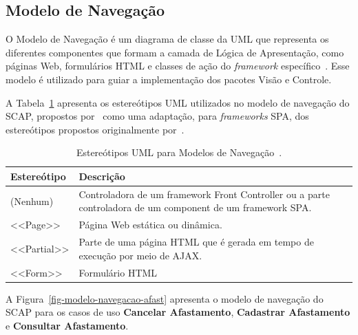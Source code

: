 
\subsection{Modelo de Navegação}
\label{subsec-frameweb-navegacao}

O Modelo de Navegação é um diagrama de classe da UML que representa os diferentes componentes que
formam a camada de Lógica de Apresentação, como páginas Web, formulários HTML e classes de ação do \textit{framework} específico~\cite{souza:2007}. 
Esse modelo é utilizado para guiar a implementação dos pacotes Visão e Controle.

A Tabela~\ref{tab-estereotipos-navegacao} apresenta os estereótipos UML utilizados no modelo de navegação do SCAP,
propostos por~ como uma adaptação, para \textit{frameworks} SPA,
dos estereótipos propostos originalmente por~.

\begin{table}[h!]
    \centering
    \caption{Estereótipos UML para Modelos de Navegação~\cite{hoppe:2023}.}
    \label{tab-estereotipos-navegacao}
    \begin{tabular}{|p{3cm}|p{12cm}|}
        \hline
        \textbf{Estereótipo} & \textbf{Descrição} \\
        \hline
        (Nenhum)    & Controladora de um framework Front Controller ou a parte controladora de um component de um framework SPA. \\
        \hline
        <<Page>>    & Página Web estática ou dinâmica. \\
        \hline
        <<Partial>> & Parte de uma página HTML que é gerada em tempo de execução por meio de AJAX. \\
        \hline
        <<Form>>    & Formulário HTML \\
        \hline
    \end{tabular}
\end{table}

A Figura~\ref{fig-modelo-navegacao-afast} apresenta o modelo de navegação do SCAP para os casos de uso
\textbf{Cancelar Afastamento}, \textbf{Cadastrar Afastamento} e \textbf{Consultar Afastamento}.

